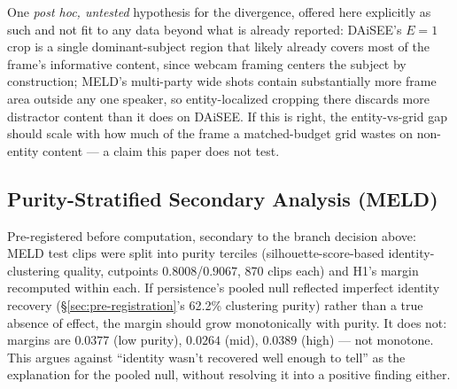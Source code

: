 One \emph{post hoc, untested} hypothesis for the divergence, offered here
explicitly as such and not fit to any data beyond what is already reported:
DAiSEE's $E{=}1$ crop is a single dominant-subject region that likely already
covers most of the frame's informative content, since webcam framing
centers the subject by construction; MELD's multi-party wide shots contain
substantially more frame area outside any one speaker, so entity-localized
cropping there discards more distractor content than it does on DAiSEE. If
this is right, the entity-vs-grid gap should scale with how much of the
frame a matched-budget grid wastes on non-entity content --- a claim this
paper does not test.

\subsection{Purity-Stratified Secondary Analysis (MELD)}
Pre-registered before computation, secondary to the branch decision above:
MELD test clips were split into purity terciles (silhouette-score-based
identity-clustering quality, cutpoints $0.8008$/$0.9067$, 870 clips each) and
H1's margin recomputed within each. If persistence's pooled null reflected
imperfect identity recovery (\S\ref{sec:pre-registration}'s 62.2\% clustering
purity) rather than a true absence of effect, the margin should grow
monotonically with purity. It does not:
margins are $0.0377$ (low purity), $0.0264$ (mid), $0.0389$ (high) --- not
monotone. This argues against ``identity wasn't recovered well enough to
tell'' as the explanation for the pooled null, without resolving it into a
positive finding either.

